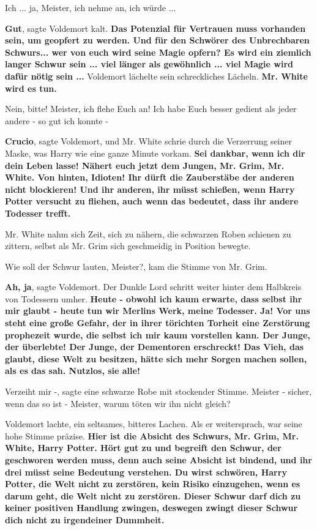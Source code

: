 \glqq{}Ich ... ja, Meister, ich nehme an, ich würde ...\grqq{}

\glqq{}\textbf{Gut}\grqq{}, sagte Voldemort kalt. \glqq{}\textbf{Das Potenzial für
Vertrauen muss vorhanden sein, um geopfert zu werden. Und für den Schwörer des
Unbrechbaren Schwurs... wer von euch wird seine Magie opfern? Es wird ein
ziemlich langer Schwur sein ... viel länger als gewöhnlich ... viel Magie wird
dafür nötig sein ...}\grqq{} Voldemort lächelte sein schreckliches Lächeln. \glqq{}
\textbf{Mr. White wird es tun.}\grqq{}

\glqq{}Nein, bitte! Meister, ich flehe Euch an! Ich habe Euch besser gedient als
jeder andere - so gut ich konnte -\grqq{}

\glqq{}\textbf{Crucio}\grqq{}, sagte Voldemort, und Mr. White schrie durch die
Verzerrung seiner Maske, was Harry wie eine ganze Minute vorkam. \glqq{}
\textbf{Sei dankbar, wenn ich dir dein Leben lasse! Nähert euch jetzt dem
Jungen, Mr. Grim, Mr. White. Von hinten, Idioten! Ihr dürft die Zauberstäbe der
anderen nicht blockieren! Und ihr anderen, ihr müsst schießen, wenn Harry Potter
versucht zu fliehen, auch wenn das bedeutet, dass ihr andere Todesser trefft.}\grqq{}

Mr. White nahm sich Zeit, sich zu nähern, die schwarzen Roben schienen zu
zittern, selbst als Mr. Grim sich geschmeidig in Position bewegte.

\glqq{}Wie soll der Schwur lauten, Meister?\grqq{}, kam die Stimme von Mr. Grim.

\glqq{}\textbf{Ah, ja}\grqq{}, sagte Voldemort. Der Dunkle Lord schritt weiter
hinter dem Halbkreis von Todessern umher. \glqq{}\textbf{Heute - obwohl ich kaum
erwarte, dass selbst ihr mir glaubt - heute tun wir Merlins Werk, meine
Todesser. Ja! Vor uns steht eine große Gefahr, der in ihrer törichten Torheit
eine Zerstörung prophezeit wurde, die selbst ich mir kaum vorstellen kann. Der
Junge, der überlebte! Der Junge, der Dementoren erschreckt! Das Vieh, das
glaubt, diese Welt zu besitzen, hätte sich mehr Sorgen machen sollen, als es das
sah. Nutzlos, sie alle!}\grqq{}

\glqq{}Verzeiht mir -\grqq{}, sagte eine schwarze Robe mit stockender Stimme.
\glqq{}Meister - sicher, wenn das so ist - Meister, warum töten wir ihn nicht
gleich?\grqq{}

Voldemort lachte, ein seltsames, bitteres Lachen. Als er weitersprach, war seine
hohe Stimme präzise. \glqq{}\textbf{Hier ist die Absicht des Schwurs, Mr. Grim,
Mr. White, Harry Potter. Hört gut zu und begreift den Schwur, der geschworen
werden muss, denn auch seine Absicht ist bindend, und ihr drei müsst seine
Bedeutung verstehen. Du wirst schwören, Harry Potter, die Welt nicht zu
zerstören, kein Risiko einzugehen, wenn es darum geht, die Welt nicht zu
zerstören. Dieser Schwur darf dich zu keiner positiven Handlung zwingen,
deswegen zwingt dieser Schwur dich nicht zu irgendeiner Dummheit.}

